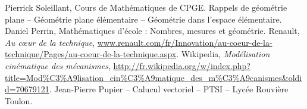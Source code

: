 \documentclass[10pt,oneside]{article}
\begin{document}
\begin{thebibliography}{2}
 Pierrick Soleillant, Cours de Mathématiques de CPGE. Rappels de géométrie plane -- Géométrie plane élémentaire -- Géométrie dans l'espace élémentaire.
 Daniel Perrin, Mathématiques d'école : Nombres, mesures et géométrie.
 Renault, \textit{Au c\oe{}ur de la technique}, \url{www.renault.com/fr/Innovation/au-coeur-de-la-technique/Pages/au-coeur-de-la-technique.aspx}.
 Wikipedia, \textit{Modélisation cinématique des mécanismes}, \url{http://fr.wikipedia.org/w/index.php?title=Mod\%C3\%A9lisation_cin\%C3\%A9matique_des_m\%C3\%A9canismes\&oldid=70679121}.
 Jean-Pierre Pupier -- Calucul vectoriel -- PTSI -- Lycée Rouvière Toulon.
\end{thebibliography}
\end{document}
